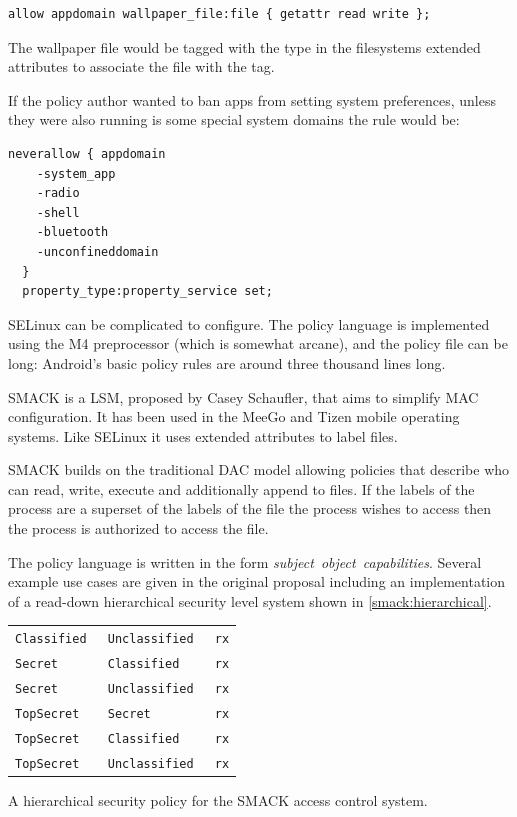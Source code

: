 \documentclass[a4paper,sfsidenotes]{%
  scrartcl%
}
\begin{document}
\begin{lstlisting}[language=selinux]
allow appdomain wallpaper_file:file { getattr read write };
\end{lstlisting}

The wallpaper file would be tagged with the  type in the
filesystems extended attributes to associate the file with the tag.

If the policy author wanted to ban apps from setting system preferences, unless
they were also running is some special system domains the rule would be:

\begin{lstlisting}[language=selinux]
neverallow { appdomain 
    -system_app 
    -radio 
    -shell 
    -bluetooth 
    -unconfineddomain
  }
  property_type:property_service set;
\end{lstlisting}

SELinux can be complicated to configure.  The policy language is implemented
using the M4 preprocessor (which is somewhat arcane), and the policy file can be
long: Android's basic policy rules are around three thousand lines long.

SMACK is a \ac{LSM}, proposed by Casey Schaufler\cite{Shaufler:_OMTJQq8}, that
aims to simplify \ac{MAC} configuration.  It has been used in the MeeGo and
Tizen mobile operating systems.  Like SELinux it uses extended attributes to
label files.

SMACK builds on the traditional \ac{DAC} model allowing policies that describe
who can read, write, execute and additionally append to files.  If the labels of
the process are a superset of the labels of the file the process wishes to
access then the process is authorized to access the file.

The policy language is written in the form \emph{subject~object~capabilities}.
Several example use cases are given in the original proposal including an
implementation of a read-down hierarchical security level system shown in
\autoref{smack:hierarchical}.

\begin{marginfigure}[h]
  \begin{tabular}{l l l}
\tt Classified &\tt  Unclassified &\tt  rx\\
\tt Secret     &\tt  Classified   &\tt  rx\\
\tt Secret     &\tt  Unclassified &\tt  rx\\
\tt TopSecret  &\tt  Secret       &\tt  rx\\
\tt TopSecret  &\tt  Classified   &\tt  rx\\
\tt TopSecret  &\tt  Unclassified &\tt  rx\\
  \end{tabular}
  \caption{A hierarchical security policy for the SMACK access control system.}
  \label{smack:hierarchical}
\end{marginfigure}
\end{document}
